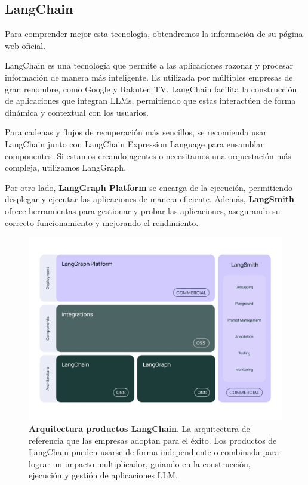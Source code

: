 \newpage

\subsection{LangChain}

Para comprender mejor esta tecnología, obtendremos la información  de su página web oficial.

LangChain es una tecnología que permite a las aplicaciones razonar y procesar información de manera más inteligente. Es utilizada por múltiples empresas de gran renombre, como Google y Rakuten TV. LangChain facilita la construcción de aplicaciones que integran LLMs, permitiendo que estas interactúen de forma dinámica y contextual con los usuarios.

Para cadenas y flujos de recuperación más sencillos, se recomienda usar LangChain junto con LangChain Expression Language para ensamblar componentes. Si estamos creando agentes o necesitamos una orquestación más compleja, utilizamos LangGraph.

Por otro lado, \textbf{LangGraph Platform} se encarga de la ejecución, permitiendo desplegar y ejecutar las aplicaciones de manera eficiente. Además, \textbf{LangSmith} ofrece herramientas para gestionar y probar las aplicaciones, asegurando su correcto funcionamiento y mejorando el rendimiento. \cite{PaginaLangChainOficial}



\begin{figure}[H]
    \centering
    \includegraphics[width=\linewidth]{imagenes/lg.jpg}
    \caption[\textbf{Arquitectura productos LangChain}.]{\textbf{Arquitectura productos LangChain}. La arquitectura de referencia que las empresas adoptan para el éxito. Los productos de LangChain pueden usarse de forma independiente o combinada para lograr un impacto multiplicador, guiando en la construcción, ejecución y gestión de aplicaciones LLM. \cite{PaginaLangChainOficial}}
    \label{productos-lang-chain}
\end{figure}


